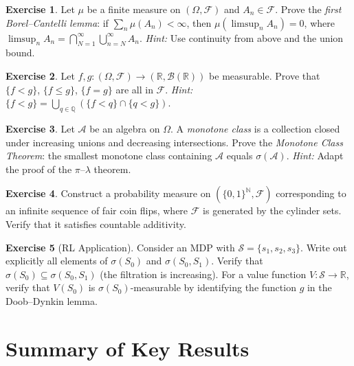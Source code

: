 \documentclass[11pt,a4paper]{article}
\theoremstyle{definition}
\newtheorem{exercise}{Exercise}[section]
\theoremstyle{plain}
\theoremstyle{remark}
\newcommand{\R}{\mathbb{R}}
\newcommand{\N}{\mathbb{N}}
\newcommand{\Q}{\mathbb{Q}}
\newcommand{\Borel}{\mathcal{B}}
\begin{document}
\begin{exercise}
Let $\mu$ be a finite measure on $(\Omega, \mathcal{F})$ and $A_n \in \mathcal{F}$.
Prove the \emph{first Borel--Cantelli lemma}: if $\sum_n \mu(A_n) < \infty$, then
$\mu(\limsup_n A_n) = 0$, where $\limsup_n A_n = \bigcap_{N=1}^\infty \bigcup_{n=N}^\infty A_n$.
\textit{Hint:} Use continuity from above and the union bound.
\end{exercise}

\begin{exercise}
Let $f, g: (\Omega, \mathcal{F}) \to (\R, \Borel(\R))$ be measurable. Prove that
$\{f < g\}$, $\{f \leq g\}$, $\{f = g\}$ are all in $\mathcal{F}$.
\textit{Hint:} $\{f < g\} = \bigcup_{q \in \Q}(\{f < q\} \cap \{q < g\})$.
\end{exercise}

\begin{exercise}
\label{ex:monotone_class}
Let $\mathcal{A}$ be an algebra on $\Omega$. A \emph{monotone class} is a collection
closed under increasing unions and decreasing intersections. Prove the
\emph{Monotone Class Theorem}: the smallest monotone class containing $\mathcal{A}$
equals $\sigma(\mathcal{A})$.
\textit{Hint:} Adapt the proof of the $\pi$--$\lambda$ theorem.
\end{exercise}

\begin{exercise}
Construct a probability measure on $(\{0,1\}^\N, \mathcal{F})$ corresponding to an
infinite sequence of fair coin flips, where $\mathcal{F}$ is generated by the
cylinder sets. Verify that it satisfies countable additivity.
\end{exercise}

\begin{exercise}[RL Application]
\label{ex:rl_filtration}
Consider an MDP with $\mathcal{S} = \{s_1, s_2, s_3\}$. Write out explicitly all
elements of $\sigma(S_0)$ and $\sigma(S_0, S_1)$. Verify that
$\sigma(S_0) \subseteq \sigma(S_0, S_1)$ (the filtration is increasing).
For a value function $V: \mathcal{S} \to \R$, verify that $V(S_0)$ is
$\sigma(S_0)$-measurable by identifying the function $g$ in the Doob--Dynkin lemma.
\end{exercise}

\section{Summary of Key Results}
\label{sec:summary}
\end{document}
